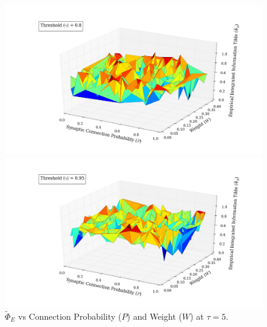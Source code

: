\documentclass[a4paper,11pt]{article}
\begin{document}
\begin{figure}[H] 
	\begin{minipage}[b]{0.5\linewidth}
		\begin{center}
		\includegraphics[scale = 0.2]{figures/snn/p_w_phi_tilde_8_5}
		\end{center}
		\vspace{4ex}
	\end{minipage}
	\begin{minipage}[b]{0.5\linewidth}
		\begin{center}
		\includegraphics[scale = 0.2]{figures/snn/p_w_phi_tilde_95_5}
		\end{center}
		\vspace{4ex}
	\end{minipage}
	\caption{
		$\widetilde{\Phi}_E$ vs Connection Probability ($P$) and Weight ($W$) at $\tau = 5.$
		\label{fig:p_w_phi_tilde_5}
	}
\end{figure}

\end{document}
